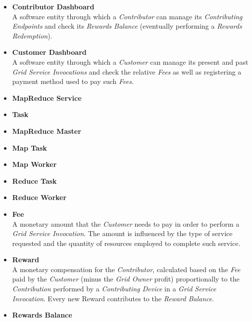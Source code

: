 \begin{itemize}
    \item \textbf{Contributor Dashboard}\label{contributor_dashboard}\\
    A software entity through which a \textit{Contributor} can manage its \textit{Contributing Endpoints} and check its \textit{Rewards Balance} (eventually performing a \textit{Rewards Redemption}).
    \item \textbf{Customer Dashboard}\label{customer_dashboard}\\
    A software entity through which a \textit{Customer} can manage its present and past \textit{Grid Service Invocations} and check the relative \textit{Fees} as well as registering a payment method used to pay such \textit{Fees}.
    \item \textbf{MapReduce Service}\label{mapreduce_service}\\
    \item \textbf{Task}\label{task}\\
    \item \textbf{MapReduce Master}\label{mapreduce_master}\\
    \item \textbf{Map Task}\label{map_task}\\
    \item \textbf{Map Worker}\label{map_worker}\\
    \item \textbf{Reduce Task}\label{reduce_task}\\
    \item \textbf{Reduce Worker}\label{reduce_worker}\\
    \item \textbf{Fee}\label{fee}\\
    A monetary amount that the \textit{Customer} needs to pay in order to perform a \textit{Grid Service Invocation}. The amount is influenced by the type of service requested and the quantity of resources employed to complete such service.
    \item \textbf{Reward}\label{reward}\\
    A monetary compensation for the \textit{Contributor}, calculated based on the \textit{Fee} paid by the \textit{Customer} (minus the \textit{Grid Owner} profit) proportionally to the \textit{Contribution} performed by a \textit{Contributing Device} in a \textit{Grid Service Invocation}. Every new Reward contributes to the \textit{Reward Balance}.
    \item \textbf{Rewards Balance}\label{rewards_balance}\\

\end{itemize}
